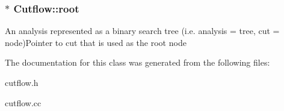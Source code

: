 \subsubsection[{\texorpdfstring{root}{root}}]{$\ast$ Cutflow\+::root\hspace{0.3cm}{\ttfamily [protected]}}\hypertarget{classCutflow_a96f2343bfae77c94f2e87b5f3a128d6d}{}\label{classCutflow_a96f2343bfae77c94f2e87b5f3a128d6d}
An analysis represented as a binary search tree (i.\+e. analysis = tree, cut = node)Pointer to cut that is used as the root node 

The documentation for this class was generated from the following files\+:\begin{DoxyCompactItemize}
\item 
cutflow.\+h\item 
cutflow.\+cc\end{DoxyCompactItemize}
